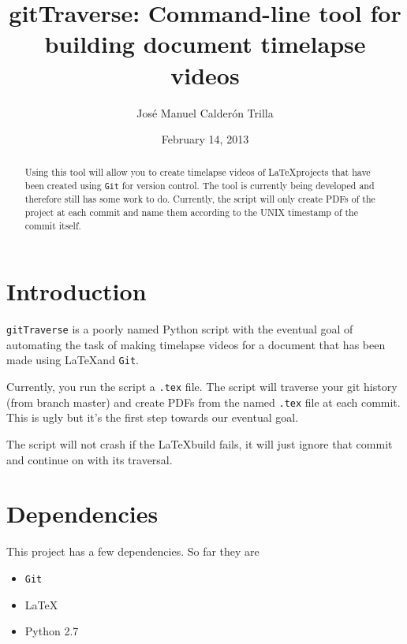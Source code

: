 \documentclass{article}
\title{gitTraverse: Command-line tool for building document timelapse videos}
\author{Jos\'{e} Manuel Calder\'{o}n Trilla}
\date{February 14, 2013}
\begin{document}
\maketitle

\begin{abstract}
Using this tool will allow you to create timelapse videos of \LaTeX projects
that have been created using \verb=Git= for version control. The tool is
currently being developed and therefore still has some work to do. Currently,
the script will only create PDFs of the project at each commit and name them
according to the UNIX timestamp of the commit itself. 
\end{abstract}

\section{Introduction}
\verb=gitTraverse= is a poorly named Python script with the eventual goal of automating
the task of making timelapse videos for a document that has been made using \LaTeX and
\verb=Git=.

Currently, you run the script a \verb=.tex= file. The script will traverse your git 
history (from branch master) and create PDFs from the named \verb=.tex= file at
each commit. This is ugly but it's the first step towards our eventual goal.

The script will not crash if the \LaTeX build fails, it will just ignore that
commit and continue on with its traversal.

\section{Dependencies}
This project has a few dependencies. So far they are

    \begin{itemize}
        \item \verb=Git=
        \item \LaTeX
        \item Python 2.7
    \end{itemize}
\end{document}

